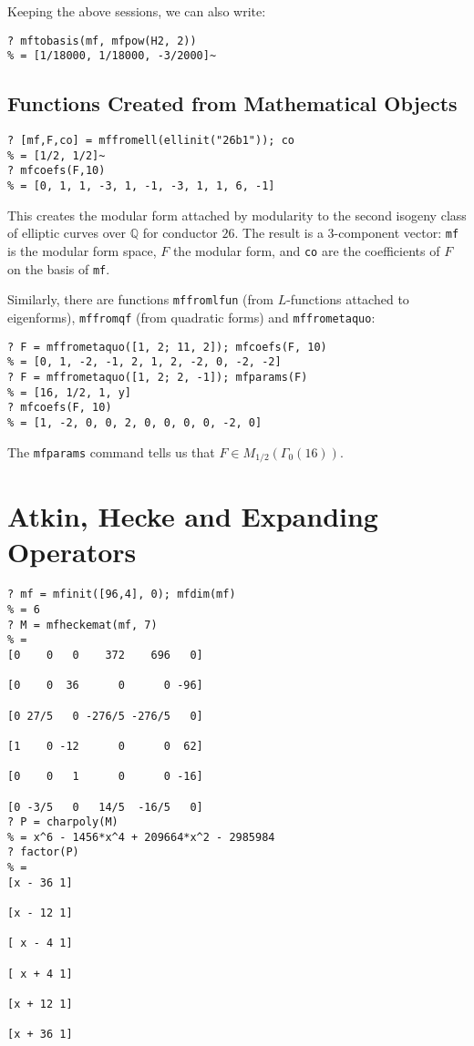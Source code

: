 \documentclass[11pt]{article}
\newcommand{\Q}{{\mathbb Q}}
\newcommand{\G}{\Gamma}
\def\kbd#1{{\tt #1}}
\begin{document}
  Keeping the above sessions, we can also write:

\begin{verbatim}
? mftobasis(mf, mfpow(H2, 2))
% = [1/18000, 1/18000, -3/2000]~
\end{verbatim}

\subsection{Functions Created from Mathematical Objects}

\begin{verbatim}
? [mf,F,co] = mffromell(ellinit("26b1")); co
% = [1/2, 1/2]~
? mfcoefs(F,10)
% = [0, 1, 1, -3, 1, -1, -3, 1, 1, 6, -1]
\end{verbatim}

This creates the modular form attached by modularity to the second isogeny
class of elliptic curves over $\Q$ for conductor $26$. The result is a
3-component vector: \kbd{mf} is the modular form space, $F$ the modular form,
and \kbd{co} are the coefficients of $F$ on the basis of \kbd{mf}.

Similarly, there are functions \kbd{mffromlfun} (from $L$-functions attached
to eigenforms), \kbd{mffromqf} (from quadratic forms) and \kbd{mffrometaquo}:

\begin{verbatim}
? F = mffrometaquo([1, 2; 11, 2]); mfcoefs(F, 10)
% = [0, 1, -2, -1, 2, 1, 2, -2, 0, -2, -2]
? F = mffrometaquo([1, 2; 2, -1]); mfparams(F)
% = [16, 1/2, 1, y]
? mfcoefs(F, 10)
% = [1, -2, 0, 0, 2, 0, 0, 0, 0, -2, 0]
\end{verbatim}

The \kbd{mfparams} command tells us that $F\in M_{1/2}(\G_0(16))$.

\section{Atkin, Hecke and Expanding Operators}

\begin{verbatim}
? mf = mfinit([96,4], 0); mfdim(mf)
% = 6
? M = mfheckemat(mf, 7)
% =
[0    0   0    372    696   0]

[0    0  36      0      0 -96]

[0 27/5   0 -276/5 -276/5   0]

[1    0 -12      0      0  62]

[0    0   1      0      0 -16]

[0 -3/5   0   14/5  -16/5   0]
? P = charpoly(M)
% = x^6 - 1456*x^4 + 209664*x^2 - 2985984
? factor(P)
% =
[x - 36 1]

[x - 12 1]

[ x - 4 1]

[ x + 4 1]

[x + 12 1]

[x + 36 1]
\end{verbatim}
\end{document}
